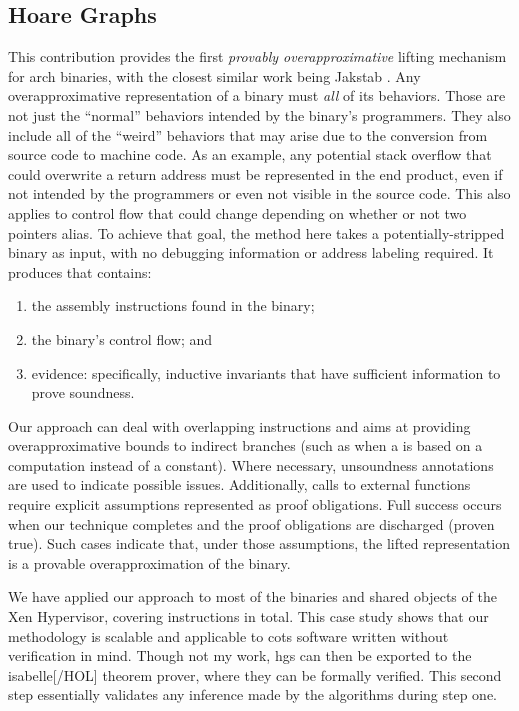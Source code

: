 \subsection{Hoare Graphs}
This contribution provides the first \emph{provably overapproximative} lifting mechanism for \gls{arch} binaries, with the closest similar work being Jakstab \autocite{kinder2010static,kinder2012alternating,kinder2012virtualization}.
Any overapproximative representation of a binary must \emph{all} of its behaviors.
Those are not just the ``normal'' behaviors intended by the binary's programmers.
They also include all of the ``weird'' behaviors that may arise due to the conversion from source code to machine code.
As an example, any potential stack overflow that could overwrite a return address must be represented in the end product, even if not intended by the programmers or even not visible in the source code.
This also applies to control flow that could change depending on whether or not two pointers alias.
To achieve that goal, the method here takes a potentially-stripped binary as input, with no debugging information or address labeling required.
It produces  that contains:
\begin{enumerate}
  \item the assembly instructions found in the binary;
  \item the binary's control flow; and
  \item evidence: specifically, inductive invariants that have sufficient information to prove soundness.
\end{enumerate}
Our approach can deal with overlapping instructions and aims at providing overapproximative bounds to indirect branches (such as when a  is based on a computation instead of a constant).
Where necessary, unsoundness annotations are used to indicate possible issues.
Additionally, calls to external functions require explicit assumptions represented as proof obligations.
Full success occurs when our technique completes and the proof obligations are discharged (proven true).
Such cases indicate that, under those assumptions, the lifted representation is a provable overapproximation of the binary.

We have applied our approach to most of the binaries and shared objects of the Xen Hypervisor, covering  instructions in total.
This case study shows that our methodology is scalable and applicable to \gls{cots} software written without verification in mind.
Though not my work, \glspl{hg} can then be exported to the \gls{isabelle}[/HOL] theorem prover, where they can be formally verified.
This second step essentially validates any inference made by the algorithms during step one.

